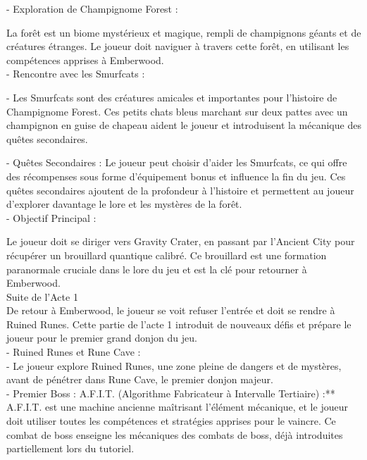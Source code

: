 - Exploration de Champignome Forest : 

 La forêt est un biome mystérieux et magique, rempli de champignons géants et de créatures étranges. Le joueur doit naviguer à travers cette forêt, en utilisant les compétences apprises à Emberwood. 
\\
 
  

- Rencontre avec les Smurfcats : 

- Les Smurfcats sont des créatures amicales et importantes pour l'histoire de Champignome Forest. Ces petits chats bleus marchant sur deux pattes avec un champignon en guise de chapeau aident le joueur et introduisent la mécanique des quêtes secondaires. 

  - Quêtes Secondaires : Le joueur peut choisir d'aider les Smurfcats, ce qui offre des récompenses sous forme d'équipement bonus et influence la fin du jeu. Ces quêtes secondaires ajoutent de la profondeur à l'histoire et permettent au joueur d'explorer davantage le lore et les mystères de la forêt. 
  \\
 
 

- Objectif Principal : 

 Le joueur doit se diriger vers Gravity Crater, en passant par l'Ancient City pour récupérer un brouillard quantique calibré. Ce brouillard est une formation paranormale cruciale dans le lore du jeu et est la clé pour retourner à Emberwood. 
 \\
 

 

Suite de l'Acte 1 
\\
 

  

De retour à Emberwood, le joueur se voit refuser l'entrée et doit se rendre à Ruined Runes. Cette partie de l'acte 1 introduit de nouveaux défis et prépare le joueur pour le premier grand donjon du jeu. 
\\
 

  

- Ruined Runes et Rune Cave : 
\\
 

  - Le joueur explore Ruined Runes, une zone pleine de dangers et de mystères, avant de pénétrer dans Rune Cave, le premier donjon majeur. 
  \\
 

  - Premier Boss : A.F.I.T. (Algorithme Fabricateur à Intervalle Tertiaire) :** A.F.I.T. est une machine ancienne maîtrisant l'élément mécanique, et le joueur doit utiliser toutes les compétences et stratégies apprises pour le vaincre. Ce combat de boss enseigne les mécaniques des combats de boss, déjà introduites partiellement lors du tutoriel. 
  \\
 

